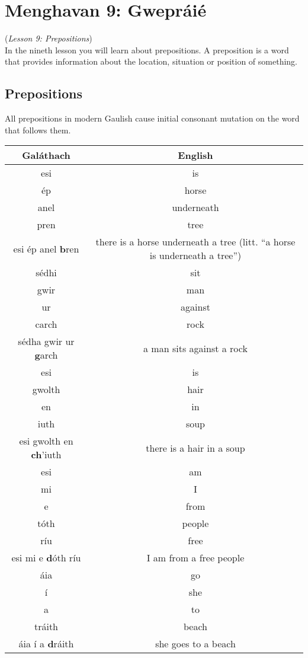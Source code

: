 \section{Menghavan 9: Gwepr\'{a}i\'{e}}
(\textit{Lesson 9: Prepositions})\\

In the nineth lesson you will learn about prepositions. A preposition is a word that provides information about the location, situation or position of something.

\subsection{Prepositions}

All prepositions in modern Gaulish cause initial consonant mutation on the word that follows them.
\begin{table}[H]
\centering
\begin{tabu}{c|c}
  \textbf{Gal\'{a}thach} & \textbf{English}\\
  \toprule
  esi & is\\
  \'{e}p & horse\\
  anel & underneath\\
  pren & tree\\
  esi \'{e}p anel \textbf{b}ren & there is a horse underneath a tree (litt. ``a horse is underneath a tree'')\\
  \midrule
  s\'{e}dhi & sit\\
  gwir & man\\
  ur & against\\
  carch & rock\\
  s\'{e}dha gwir ur \textbf{g}arch & a man sits against a rock\\
  \midrule
  esi & is\\
  gwolth & hair\\
  en & in\\
  iuth & soup\\
  esi gwolth en \textbf{ch}'iuth & there is a hair in a soup\\
  \midrule
  esi & am\\
  mi & I\\
  e & from\\
  t\'{o}th & people\\
  r\'{i}u & free\\
  esi mi e \textbf{d}\'{o}th r\'{i}u & I am from a free people\\
  \midrule
  \'{a}ia & go\\
  \'{i} & she\\
  a & to\\
  tr\'{a}ith & beach\\
  \'{a}ia \'{i} a \textbf{d}r\'{a}ith & she goes to a beach
\end{tabu}
\label{examples_prepositions}
\end{table}

